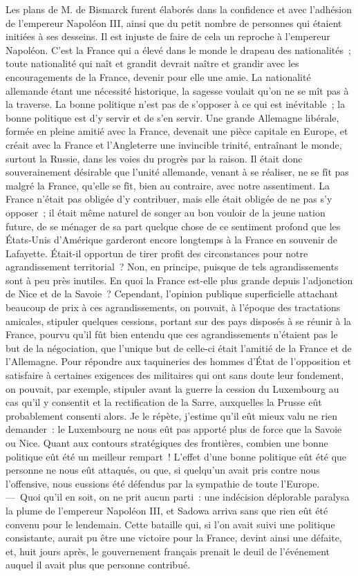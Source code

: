 \documentclass[french,twoside]{book} %
\begin{document}
Les plans de M. de Bismarck furent élaborés dans la confidence et avec l’adhésion de l’empereur Napoléon III, ainsi que du petit nombre de personnes qui étaient initiées à ses desseins. Il est injuste de faire de cela un reproche à l’empereur Napoléon. C’est la France qui a élevé dans le monde le drapeau des nationalités ; toute nationalité qui naît et grandit devrait naître et grandir avec les encouragements de la France, devenir pour elle une amie. La nationalité allemande étant une nécessité historique, la sagesse voulait qu’on ne se mît pas à la traverse. La bonne politique n’est pas de s’opposer à ce qui est inévitable ; la bonne politique est d’y servir et de s’en servir. Une grande Allemagne libérale, formée en pleine amitié avec la France, devenait une pièce capitale en Europe, et créait avec la France et l’Angleterre une invincible trinité, entraînant le monde, surtout la Russie, dans les voies du progrès par la raison. Il était donc souverainement désirable que l’unité allemande, venant à se réaliser, ne se fît pas malgré la France, qu’elle se fît, bien au contraire, avec notre assentiment. La France n’était pas obligée d’y contribuer, mais elle était obligée de ne pas s’y opposer ; il était même naturel de songer au bon vouloir de la jeune nation future, de se ménager de sa part quelque chose de ce sentiment profond que les États-Unis d’Amérique garderont encore longtemps à la France en souvenir de Lafayette. Était-il opportun de tirer profit des circonstances pour notre agrandissement territorial ? Non, en principe, puisque de tels agrandissements sont à peu près inutiles. En quoi la France est-elle plus grande depuis l’adjonction de Nice et de la Savoie ? Cependant, l’opinion publique superficielle attachant beaucoup de prix à ces agrandissements, on pouvait, à l’époque des tractations amicales, stipuler quelques cessions, portant sur des pays disposés à se réunir à la France, pourvu qu’il fût bien entendu que ces agrandissements n’étaient pas le but de la négociation, que l’unique but de celle-ci était l’amitié de la France et de l’Allemagne. Pour répondre aux taquineries des hommes d’État de l’opposition et satisfaire à certaines exigences des militaires qui ont sans doute leur fondement, on pouvait, par exemple, stipuler avant la guerre la cession du Luxembourg au cas qu’il y consentit et la rectification de la Sarre, auxquelles la Prusse eût probablement consenti alors. Je le répète, j’estime qu’il eût mieux valu ne rien demander : le Luxembourg ne nous eût pas apporté plus de force que la Savoie ou Nice. Quant aux contours stratégiques des frontières, combien une bonne politique eût été un meilleur rempart ! L’effet d’une bonne politique eût été que personne ne nous eût attaqués, ou que, si quelqu’un avait pris contre nous l’offensive, nous eussions été défendus par la sympathie de toute l’Europe. — Quoi qu’il en soit, on ne prit aucun parti : une indécision déplorable paralysa la plume de l’empereur Napoléon III, et Sadowa arriva sans que rien eût été convenu pour le lendemain. Cette bataille qui, si l’on avait suivi une politique consistante, aurait pu être une victoire pour la France, devint ainsi une défaite, et, huit jours après, le gouvernement français prenait le deuil de l’événement auquel il avait plus que personne contribué.\par
\end{document}

